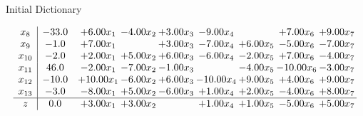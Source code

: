 \documentclass[8pt]{article}
\begin{document}
Initial Dictionary 

\[\begin{array}{c| c c@{\hskip 2pt} c@{\hskip 2pt} c@{\hskip 2pt} c@{\hskip 2pt} c@{\hskip 2pt} c@{\hskip 2pt} c@{\hskip 2pt} }
 x_{8}   &  -33.0 & +  6.00 x_{1} & -4.00 x_{2} & +  3.00 x_{3} & -9.00 x_{4} &   & +  7.00 x_{6} & +  9.00 x_{7}\\
 x_{9}   &  -1.0 & +  7.00 x_{1} &   & +  3.00 x_{3} & -7.00 x_{4} & +  6.00 x_{5} & -5.00 x_{6} & -7.00 x_{7}\\
 x_{10}   &  -2.0 & +  2.00 x_{1} & +  5.00 x_{2} & +  6.00 x_{3} & -6.00 x_{4} & -2.00 x_{5} & +  7.00 x_{6} & -4.00 x_{7}\\
 x_{11}   &  46.0 & -2.00 x_{1} & -7.00 x_{2} & -1.00 x_{3} &   & -4.00 x_{5} & -10.00 x_{6} & -3.00 x_{7}\\
 x_{12}   &  -10.0 & + 10.00 x_{1} & -6.00 x_{2} & +  6.00 x_{3} & -10.00 x_{4} & +  9.00 x_{5} & +  4.00 x_{6} & +  9.00 x_{7}\\
 x_{13}   &  -3.0 & -8.00 x_{1} & +  5.00 x_{2} & -6.00 x_{3} & +  1.00 x_{4} & +  2.00 x_{5} & -4.00 x_{6} & +  8.00 x_{7}\\
\hline
z    &  0.0 & +  3.00 x_{1} & +  3.00 x_{2} &   & +  1.00 x_{4} & +  1.00 x_{5} & -5.00 x_{6} & +  5.00 x_{7}\\
\end{array}\]
\end{document}
